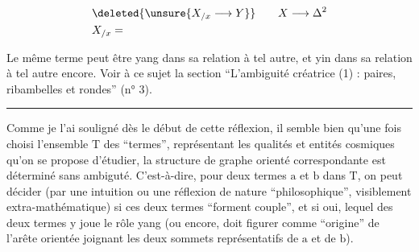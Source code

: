 \[
\begin{aligned}
 &\deleted{\unsure{X_{/x}\longrightarrow Y}}\qquad X\longrightarrow\Delta^2\\
 &X_{/x}=
\end{aligned}
\]

Le même terme peut être yang dans sa relation à tel autre, et yin dans sa relation à tel autre encore. Voir à ce sujet la section ``L'ambiguité créatrice (1) : paires, ribambelles et rondes'' (n° 3).

\noindent\rule{8em}{.4pt}

Comme je l'ai souligné dès le début de cette réflexion, il semble bien qu'une fois choisi l'ensemble $\mathrm T$ des ``termes'', représentant les qualités et entités cosmiques qu'on se propose d'étudier, la structure de graphe orienté correspondante est déterminé sans ambigu\leavevmode{}\handwritten{\"{\phantom{\i}}}té. C'est-à-dire, pour deux termes $\mathrm a$ et $\mathrm b$ dans $\mathrm T$, on peut décider (par une intuition ou une réflexion de nature ``philosophique'', visiblement extra-mathématique) si ces deux termes ``forment couple'', et si oui, lequel des deux termes y joue le rôle yang (ou encore, doit figurer comme ``origine'' de l'arête orientée joignant les deux sommets représentatifs de $\mathrm a$ et de $\mathrm b$).

